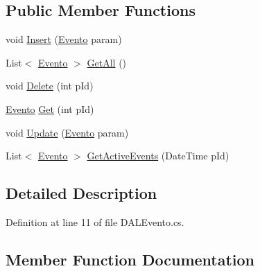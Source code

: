 \subsection*{Public Member Functions}
\begin{DoxyCompactItemize}
\item 
void \hyperlink{classprj_progra_i_i_i_1_1_layer_1_1_d_a_l_1_1_d_a_l_evento_a0bc4cec389945eb6f5f796c63616d032}{Insert} (\hyperlink{classprj_progra_i_i_i_1_1_layer_1_1_entities_1_1_evento}{Evento} param)
\item 
List$<$ \hyperlink{classprj_progra_i_i_i_1_1_layer_1_1_entities_1_1_evento}{Evento} $>$ \hyperlink{classprj_progra_i_i_i_1_1_layer_1_1_d_a_l_1_1_d_a_l_evento_a513523b7c4cb6204629239b3c06c3baa}{Get\+All} ()
\item 
void \hyperlink{classprj_progra_i_i_i_1_1_layer_1_1_d_a_l_1_1_d_a_l_evento_a269652e78dd2e186b0b330c250a90cda}{Delete} (int p\+Id)
\item 
\hyperlink{classprj_progra_i_i_i_1_1_layer_1_1_entities_1_1_evento}{Evento} \hyperlink{classprj_progra_i_i_i_1_1_layer_1_1_d_a_l_1_1_d_a_l_evento_aaaa8b7f305fa6367d39bc53308d96aec}{Get} (int p\+Id)
\item 
void \hyperlink{classprj_progra_i_i_i_1_1_layer_1_1_d_a_l_1_1_d_a_l_evento_a173c20de2fec58a207baa8204cbcaefd}{Update} (\hyperlink{classprj_progra_i_i_i_1_1_layer_1_1_entities_1_1_evento}{Evento} param)
\item 
List$<$ \hyperlink{classprj_progra_i_i_i_1_1_layer_1_1_entities_1_1_evento}{Evento} $>$ \hyperlink{classprj_progra_i_i_i_1_1_layer_1_1_d_a_l_1_1_d_a_l_evento_ad6d492b77a450533f979d1a67993fb17}{Get\+Active\+Events} (Date\+Time p\+Id)
\end{DoxyCompactItemize}


\subsection{Detailed Description}


Definition at line 11 of file D\+A\+L\+Evento.\+cs.



\subsection{Member Function Documentation}
\hypertarget{classprj_progra_i_i_i_1_1_layer_1_1_d_a_l_1_1_d_a_l_evento_a269652e78dd2e186b0b330c250a90cda}{}\label{classprj_progra_i_i_i_1_1_layer_1_1_d_a_l_1_1_d_a_l_evento_a269652e78dd2e186b0b330c250a90cda} 

